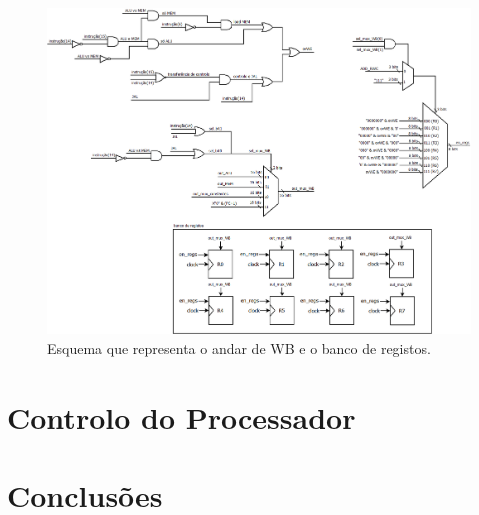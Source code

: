 \documentclass[11pt]{article}
\numberwithin{equation}{section}
\begin{document}
\begin{figure}[h]
	\centering
	\includegraphics[keepaspectratio=true, scale=0.33]{imagens/WB}
	\caption{Esquema que representa o andar de WB e o banco de registos.}
	\vspace{-0.8em}
\end{figure}

\section{Controlo do Processador}


\section{Conclusões}

\pagebreak

\listoftodos
\end{document}
